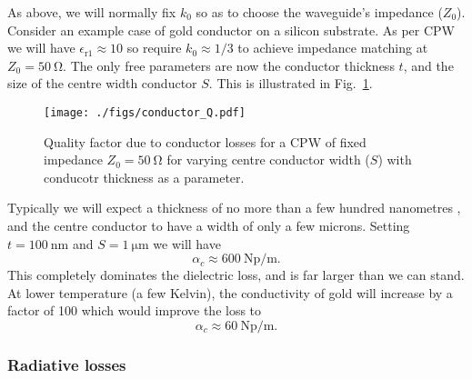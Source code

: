 

As above, we will normally fix $k_0$ so as to choose the waveguide's impedance
($Z_0$). Consider an example case of gold conductor on a silicon substrate. As
per CPW\cite{1127105}  we will have $\epsilon_\mathrm{r1} \approx 10$ so require $k_0
\approx 1/3$ to achieve impedance matching at $Z_0 = \SI{50}{\ohm}$. The only
free parameters are now the conductor thickness $t$, and the size of the centre
width conductor $S$. This is illustrated in Fig.~\ref{fig:conductorQ}.

\begin{figure}
  \texttt{[image: ./figs/conductor\_Q.pdf]}
  \caption{Quality factor due to conductor losses for a CPW of fixed impedance
  $Z_0=\SI{50}{\ohm}$ for varying centre conductor width ($S$) with conducotr
  thickness as a parameter.}
  \label{fig:conductorQ}
\end{figure}

Typically we will expect a thickness of no more than a few hundred nanometres
,
and the centre conductor to have a width of only a few microns. Setting
$t=\SI{100}{\nano\metre}$ and $S=\SI{1}{\micro\metre}$ we will have
\begin{equation}
  \alpha_c \approx \SI{600}{\neper \per \meter}.
\end{equation}
This completely dominates the dielectric loss, and is far larger than we can
stand. At lower temperature (a few Kelvin), the conductivity of gold will
increase by a factor of 100 which would improve the loss to
\begin{equation}
  \alpha_c \approx \SI{60}{\neper \per \meter}.
\end{equation}


\subsubsection{Radiative losses}

